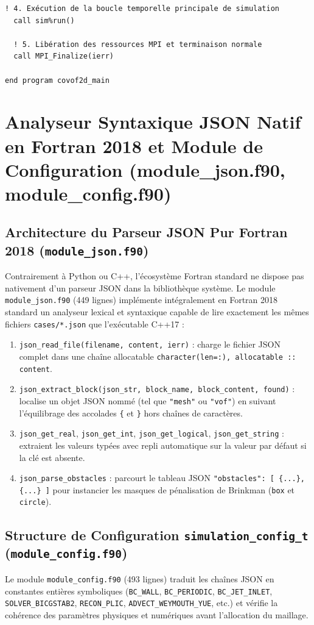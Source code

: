 \documentclass[10pt,a4paper,oneside]{book}
\begin{document}
\begin{lstlisting}[language={[95]Fortran}]
  ! 4. Exécution de la boucle temporelle principale de simulation
  call sim%run()

  ! 5. Libération des ressources MPI et terminaison normale
  call MPI_Finalize(ierr)

end program covof2d_main

\end{lstlisting}

\chapter{Analyseur Syntaxique JSON Natif en Fortran 2018 et Module de Configuration (module_json.f90, module_config.f90)}
\section{Architecture du Parseur JSON Pur Fortran 2018 (\texttt{module\_json.f90})}
Contrairement à Python ou C++, l'écosystème Fortran standard ne dispose pas nativement d'un parseur JSON dans la bibliothèque système. Le module \texttt{module\_json.f90} (449 lignes) implémente intégralement en Fortran 2018 standard un analyseur lexical et syntaxique capable de lire exactement les mêmes fichiers \texttt{cases/*.json} que l'exécutable C++17 :
\begin{enumerate}
  \item \texttt{json\_read\_file(filename, content, ierr)} : charge le fichier JSON complet dans une chaîne allocatable \texttt{character(len=:), allocatable :: content}.
  \item \texttt{json\_extract\_block(json\_str, block\_name, block\_content, found)} : localise un objet JSON nommé (tel que \texttt{"mesh"} ou \texttt{"vof"}) en suivant l'équilibrage des accolades \texttt{\{} et \texttt{\}} hors chaînes de caractères.
  \item \texttt{json\_get\_real}, \texttt{json\_get\_int}, \texttt{json\_get\_logical}, \texttt{json\_get\_string} : extraient les valeurs typées avec repli automatique sur la valeur par défaut si la clé est absente.
  \item \texttt{json\_parse\_obstacles} : parcourt le tableau JSON \texttt{"obstacles": [ \{...\}, \{...\} ]} pour instancier les masques de pénalisation de Brinkman (\texttt{box} et \texttt{circle}).
\end{enumerate}

\section{Structure de Configuration \texttt{simulation\_config\_t} (\texttt{module\_config.f90})}
Le module \texttt{module\_config.f90} (493 lignes) traduit les chaînes JSON en constantes entières symboliques (\texttt{BC\_WALL}, \texttt{BC\_PERIODIC}, \texttt{BC\_JET\_INLET}, \texttt{SOLVER\_BICGSTAB2}, \texttt{RECON\_PLIC}, \texttt{ADVECT\_WEYMOUTH\_YUE}, etc.) et vérifie la cohérence des paramètres physiques et numériques avant l'allocation du maillage.
\end{document}
